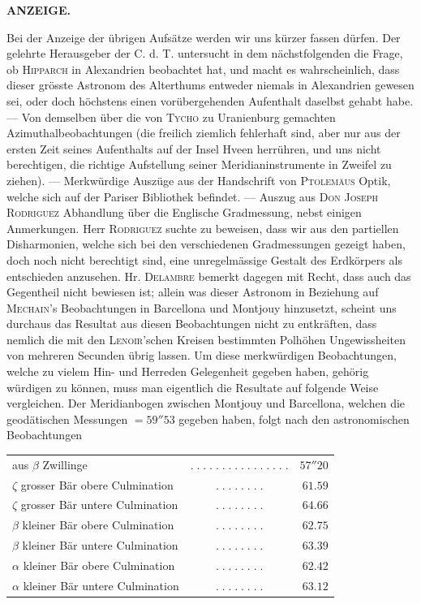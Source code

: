 \noindent{}%
%
\parbox[t]{\dimexpr\linewidth-24mm\relax}{\centering\footnotesize\bfseries ANZEIGE.}%
\makebox[12mm][r]{}\par\nobreak\medskip
Bei der Anzeige der übrigen Aufsätze werden wir uns kürzer fassen dürfen. Der gelehrte Herausgeber der C. d. T. untersucht in dem nächstfolgenden die Frage, ob \textsc{Hipparch} in Alexandrien beobachtet hat, und macht es wahrscheinlich, dass dieser grösste Astronom des Alterthums entweder niemals in Alexandrien gewesen sei, oder doch höchstens einen vorübergehenden Aufenthalt daselbst gehabt habe. --- Von demselben über die von \textsc{Tycho} zu Uranienburg gemachten Azimuthalbeobachtungen (die freilich ziemlich fehlerhaft sind, aber nur aus der ersten Zeit seines Aufenthalts auf der Insel Hveen herrühren, und uns nicht berechtigen, die richtige Aufstellung seiner Meridianinstrumente in Zweifel zu ziehen). --- Merkwürdige Auszüge aus der Handschrift von \textsc{Ptolemäus} Optik, welche sich auf der Pariser Bibliothek befindet. --- Auszug aus \textsc{Don Joseph Rodriguez} Abhandlung über die Englische Gradmessung, nebst einigen Anmerkungen. Herr \textsc{Rodriguez} suchte zu beweisen, dass wir aus den partiellen Disharmonien, welche sich bei den verschiedenen Gradmessungen gezeigt haben, doch noch nicht berechtigt sind, eine unregelmässige Gestalt des Erdkörpers als entschieden anzusehen. Hr. \textsc{Delambre} bemerkt dagegen mit Recht, dass auch das Gegentheil nicht bewiesen ist; allein was dieser Astronom in Beziehung auf \textsc{Mechain}'s Beobachtungen in Barcellona und Montjouy hinzusetzt, scheint uns durchaus das Resultat aus diesen Beobachtungen nicht zu entkräften, dass nemlich die mit den \textsc{Lenoir}'schen Kreisen bestimmten Polhöhen Ungewissheiten von mehreren Secunden übrig lassen. Um diese merkwürdigen Beobachtungen, welche zu vielem Hin- und Herreden Gelegenheit gegeben haben, gehörig würdigen zu können, muss man eigentlich die Resultate auf folgende Weise vergleichen. Der Meridianbogen zwischen Montjouy und Barcellona, welchen die geodätischen Messungen $=59''53$ gegeben haben, folgt nach den astronomischen Beobachtungen
\begin{center}
\fontsize{9}{11}\selectfont\setlength{\tabcolsep}{3pt}\begin{tabular}{@{}l c r@{}}
aus $\beta$ Zwillinge & $.\;.\;.\;.\;.\;.\;.\;.\;.\;.\;.\;.\;.\;.\;.\;.$ & $57''20$\\
$\zeta$ grosser Bär obere Culmination & $.\;.\;.\;.\;.\;.\;.\;.$ & $61.59$\\
$\zeta$ grosser Bär untere Culmination & $.\;.\;.\;.\;.\;.\;.\;.$ & $64.66$\\
$\beta$ kleiner Bär obere Culmination & $.\;.\;.\;.\;.\;.\;.\;.$ & $62.75$\\
$\beta$ kleiner Bär untere Culmination & $.\;.\;.\;.\;.\;.\;.\;.$ & $63.39$\\
$\alpha$ kleiner Bär obere Culmination & $.\;.\;.\;.\;.\;.\;.\;.$ & $62.42$\\
$\alpha$ kleiner Bär untere Culmination & $.\;.\;.\;.\;.\;.\;.\;.$ & $63.12$\\
\end{tabular}
\end{center}
